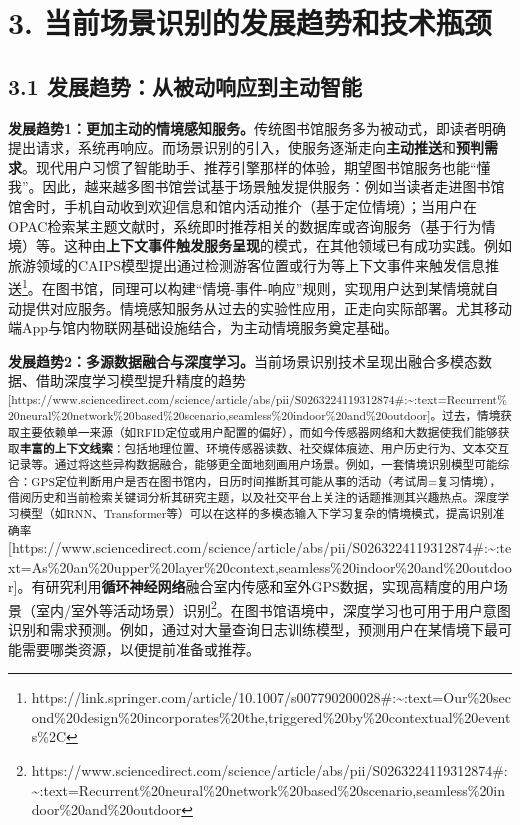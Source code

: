 \documentclass[
  letterpaper,
]{scrbook}
\begin{document}
\section{3.
当前场景识别的发展趋势和技术瓶颈}\label{ux5f53ux524dux573aux666fux8bc6ux522bux7684ux53d1ux5c55ux8d8bux52bfux548cux6280ux672fux74f6ux9888}

\subsection{3.1
发展趋势：从被动响应到主动智能}\label{ux53d1ux5c55ux8d8bux52bfux4eceux88abux52a8ux54cdux5e94ux5230ux4e3bux52a8ux667aux80fd}

\textbf{发展趋势1：更加主动的情境感知服务。}传统图书馆服务多为被动式，即读者明确提出请求，系统再响应。而场景识别的引入，使服务逐渐走向\textbf{主动推送}和\textbf{预判需求}。现代用户习惯了智能助手、推荐引擎那样的体验，期望图书馆服务也能``懂我''。因此，越来越多图书馆尝试基于场景触发提供服务：例如当读者走进图书馆馆舍时，手机自动收到欢迎信息和馆内活动推介（基于定位情境）；当用户在OPAC检索某主题文献时，系统即时推荐相关的数据库或咨询服务（基于行为情境）等。这种由\textbf{上下文事件触发服务呈现}的模式，在其他领域已有成功实践。例如旅游领域的CAIPS模型提出通过检测游客位置或行为等上下文事件来触发信息推送\footnote{https://link.springer.com/article/10.1007/s007790200028\#:\textasciitilde:text=Our\%20second\%20design\%20incorporates\%20the,triggered\%20by\%20contextual\%20events\%2C}。在图书馆，同理可以构建``情境-事件-响应''规则，实现用户达到某情境就自动提供对应服务。情境感知服务从过去的实验性应用，正走向实际部署。尤其移动端App与馆内物联网基础设施结合，为主动情境服务奠定基础。

\textbf{发展趋势2：多源数据融合与深度学习。}当前场景识别技术呈现出融合多模态数据、借助深度学习模型提升精度的趋势\textsuperscript{{[}https://www.sciencedirect.com/science/article/abs/pii/S0263224119312874\#:\textasciitilde:text=Recurrent\%20neural\%20network\%20based\%20scenario,seamless\%20indoor\%20and\%20outdoor{]}。过去，情境获取主要依赖单一来源（如RFID定位或用户配置的偏好），而如今传感器网络和大数据使我们能够获取\textbf{丰富的上下文线索}：包括地理位置、环境传感器读数、社交媒体痕迹、用户历史行为、文本交互记录等。通过将这些异构数据融合，能够更全面地刻画用户场景。例如，一套情境识别模型可能综合：GPS定位判断用户是否在图书馆内，日历时间推断其可能从事的活动（考试周=复习情境），借阅历史和当前检索关键词分析其研究主题，以及社交平台上关注的话题推测其兴趣热点。深度学习模型（如RNN、Transformer等）可以在这样的多模态输入下学习复杂的情境模式，提高识别准确率}{[}https://www.sciencedirect.com/science/article/abs/pii/S0263224119312874\#:\textasciitilde:text=As\%20an\%20upper\%20layer\%20context,seamless\%20indoor\%20and\%20outdoor{]}。有研究利用\textbf{循环神经网络}融合室内传感和室外GPS数据，实现高精度的用户场景（室内/室外等活动场景）识别\footnote{https://www.sciencedirect.com/science/article/abs/pii/S0263224119312874\#:\textasciitilde:text=Recurrent\%20neural\%20network\%20based\%20scenario,seamless\%20indoor\%20and\%20outdoor}。在图书馆语境中，深度学习也可用于用户意图识别和需求预测。例如，通过对大量查询日志训练模型，预测用户在某情境下最可能需要哪类资源，以便提前准备或推荐。
\end{document}
